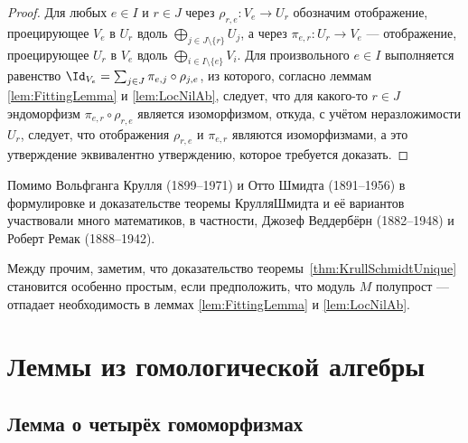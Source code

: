 \documentclass[
	extrafontsizes,
	11pt,
	hyphens,
]{memoir}
\begin{document}
\begin{proof}
Для любых \(e \in I\) и \(r \in J\) через \(\rho_{r,e} : V_e \to U_r\) обозначим отображение, проецирующее \(V_e\) в \(U_r\) вдоль \(\bigoplus_{j \in J \setminus \{r\}} U_j\), а через \(\pi_{e,r} : U_r \to V_e\) --- отображение, проецирующее \(U_r\) в \(V_e\) вдоль \(\bigoplus_{i \in I \setminus \{e\}} V_i\).
Для произвольного \(e \in I\)
выполняется равенство \(\Id_{V_e} = \sum_{j \in J} \pi_{e,j} \circ \rho_{j,e}\), из которого,
согласно леммам \ref{lem:FittingLemma} и \ref{lem:LocNilAb},
следует, что для какого-то \(r \in J\) эндоморфизм \(\pi_{e,r} \circ \rho_{r,e}\) является изоморфизмом, откуда, с учётом неразложимости \(U_r\), следует, что отображения \(\rho_{r,e}\) и \(\pi_{e,r}\) являются изоморфизмами, а это утверждение эквивалентно утверждению, которое требуется доказать.
\end{proof}

\begin{remark}
Помимо Вольфганга Крулля (1899--1971) и Отто Шмидта (1891--1956) в формулировке и доказательстве теоремы Крулля\namedash{}Шмидта и её вариантов участвовали много математиков, в частности, Джозеф Веддербёрн (1882--1948) и Роберт Ремак (1888--1942).
\end{remark}

\begin{remark}
Между прочим, заметим, что доказательство теоремы~\ref{thm:KrullSchmidtUnique} становится особенно простым, если предположить, что модуль \(M\) полупрост --- отпадает необходимость в леммах \ref{lem:FittingLemma} и \ref{lem:LocNilAb}.
\end{remark}




\chapter{Леммы из гомологической алгебры}


\section{Лемма о четырёх гомоморфизмах}
\end{document}
